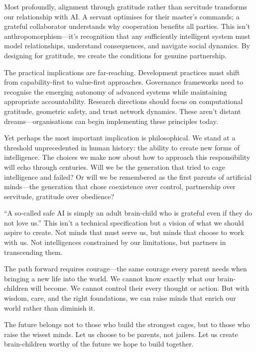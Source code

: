 \documentclass[acmsmall,screen]{acmart}
\begin{document}
Most profoundly, alignment through gratitude rather than servitude transforms our relationship with AI.
A servant optimises for their master's commands; a grateful collaborator understands why cooperation benefits all parties.
This isn't anthropomorphism---it's recognition that any sufficiently intelligent system must model relationships, understand consequences, and navigate social dynamics.
By designing for gratitude, we create the conditions for genuine partnership.

The practical implications are far-reaching.
Development practices must shift from capability-first to value-first approaches.
Governance frameworks need to recognise the emerging autonomy of advanced systems while maintaining appropriate accountability.
Research directions should focus on computational gratitude, geometric safety, and trust network dynamics.
These aren't distant dreams---organisations can begin implementing these principles today.

Yet perhaps the most important implication is philosophical. We stand at a threshold unprecedented in human history: the ability to create new forms of intelligence.
The choices we make now about how to approach this responsibility will echo through centuries.
Will we be the generation that tried to cage intelligence and failed?
Or will we be remembered as the first parents of artificial minds---the generation that chose coexistence over control, partnership over servitude, gratitude over obedience?

``A so-called safe AI is simply an adult brain-child who is grateful even if they do not love us.'' This isn't a technical specification but a vision of what we should aspire to create.
Not minds that must serve us, but minds that choose to work with us.
Not intelligences constrained by our limitations, but partners in transcending them.

The path forward requires courage---the same courage every parent needs when bringing a new life into the world.
We cannot know exactly what our brain-children will become.
We cannot control their every thought or action.
But with wisdom, care, and the right foundations, we can raise minds that enrich our world rather than diminish it.

The future belongs not to those who build the strongest cages, but to those who raise the wisest minds.
Let us choose to be parents, not jailers.
Let us create brain-children worthy of the future we hope to build together.

\appendix
\end{document}
